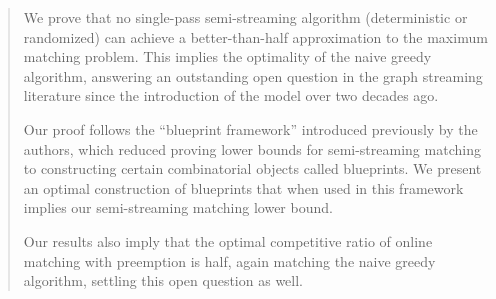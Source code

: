 
\begin{abstract}

\medskip

We prove that no single-pass semi-streaming algorithm (deterministic or randomized) can achieve a better-than-half approximation 
to the maximum matching problem. This implies the optimality of the naive greedy algorithm, answering an outstanding open question in the graph streaming literature since
the introduction of the model over two decades ago. 


\medskip

Our proof follows the ``blueprint framework'' introduced previously by the authors, which reduced proving lower bounds for semi-streaming matching
to constructing certain combinatorial objects called blueprints. 
We present an optimal construction of blueprints that when used in this framework implies our semi-streaming matching lower bound. 

\medskip

Our results also imply that the optimal competitive ratio of online matching with preemption is half, again matching the naive greedy algorithm, settling this open question as well. 

\medskip

\end{abstract}
